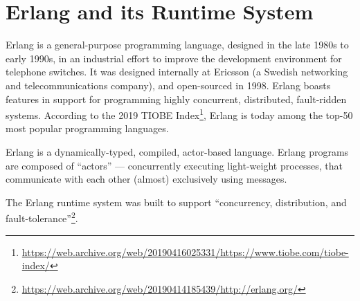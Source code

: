 \section{Erlang and its Runtime System}

Erlang is a general-purpose programming language, designed in the late
1980s to early 1990s, in an industrial effort to improve the
development environment for telephone switches. It was designed
internally at Ericsson (a Swedish networking and telecommunications
company), and open-sourced in 1998. Erlang boasts features in support
for programming highly concurrent, distributed, fault-ridden systems.
According to the 2019 TIOBE
Index\footnote{\url{https://web.archive.org/web/20190416025331/https://www.tiobe.com/tiobe-index/}},
Erlang is today among the top-50 most popular programming languages.

Erlang is a dynamically-typed, compiled, actor-based language. Erlang
programs are composed of ``actors'' --- concurrently executing
light-weight processes, that communicate with each other (almost)
exclusively using messages.

The Erlang runtime system was built to support ``concurrency,
distribution, and
fault-tolerance''\footnote{\url{https://web.archive.org/web/20190414185439/http://erlang.org/}}.

